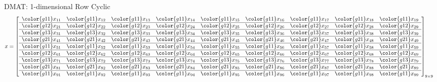 \begin{frame}
\begin{exampleblock}{DMAT: 1-dimensional Row Cyclic}
\begin{align*}
x &= \left[
      \begin{array}{lllllllll}
      \color{g11}x_{11} & \color{g11}x_{12} & \color{g11}x_{13} & 
\color{g11}x_{14} & \color{g11}x_{15} & \color{g11}x_{16} & \color{g11}x_{17} & 
\color{g11}x_{18} & \color{g11}x_{19}\\\hline
      \color{g12}x_{21} & \color{g12}x_{22} & \color{g12}x_{23} & 
\color{g12}x_{24} & \color{g12}x_{25} & \color{g12}x_{26} & \color{g12}x_{27} & 
\color{g12}x_{28} & \color{g12}x_{29}\\\hline
      \color{g13}x_{31} & \color{g13}x_{32} & \color{g13}x_{33} & 
\color{g13}x_{34} & \color{g13}x_{35} & \color{g13}x_{36} & \color{g13}x_{37} & 
\color{g13}x_{38} & \color{g13}x_{39}\\\hline
      \color{g21}x_{41} & \color{g21}x_{42} & \color{g21}x_{43} & 
\color{g21}x_{44} & \color{g21}x_{45} & \color{g21}x_{46} & \color{g21}x_{47} & 
\color{g21}x_{48} & \color{g21}x_{49}\\\hline
      \color{g11}x_{51} & \color{g11}x_{52} & \color{g11}x_{53} & 
\color{g11}x_{54} & \color{g11}x_{55} & \color{g11}x_{56} & \color{g11}x_{57} & 
\color{g11}x_{58} & \color{g11}x_{59}\\\hline
      \color{g12}x_{61} & \color{g12}x_{62} & \color{g12}x_{63} & 
\color{g12}x_{64} & \color{g12}x_{65} & \color{g12}x_{66} & \color{g12}x_{67} & 
\color{g12}x_{68} & \color{g12}x_{69}\\\hline
      \color{g13}x_{71} & \color{g13}x_{72} & \color{g13}x_{73} & 
\color{g13}x_{74} & \color{g13}x_{75} & \color{g13}x_{76} & \color{g13}x_{77} & 
\color{g13}x_{78} & \color{g13}x_{79}\\\hline
      \color{g21}x_{81} & \color{g21}x_{82} & \color{g21}x_{83} & 
\color{g21}x_{84} & \color{g21}x_{85} & \color{g21}x_{86} & \color{g21}x_{87} & 
\color{g21}x_{88} & \color{g21}x_{89}\\\hline
      \color{g11}x_{91} & \color{g11}x_{92} & \color{g11}x_{93} & 
\color{g11}x_{94} & \color{g11}x_{95} & \color{g11}x_{96} & \color{g11}x_{97} & 
\color{g11}x_{98} & \color{g11}x_{99}\\
      \end{array}
\right]_{9\times 9}
\end{align*}
\vspace{-.6cm}
\begin{align*}

\end{align*}
\end{exampleblock}
\end{frame}

